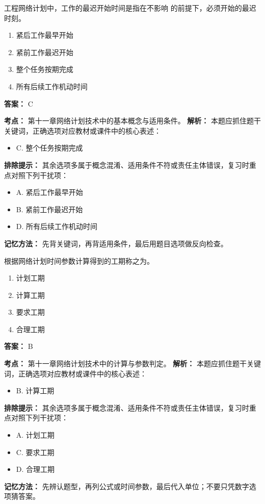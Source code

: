 \documentclass[UTF8,fontset=fandol,11pt]{ctexart}
\begin{document}
\begin{quizbox}[title={第 2 题}]
工程网络计划中，工作的最迟开始时间是指在不影响 的前提下，必须开始的最迟时刻。\\
\begin{enumerate}[label=\Alph*.]
\item 紧后工作最早开始
\item 紧前工作最迟开始
\item 整个任务按期完成
\item 所有后续工作机动时间
\end{enumerate}
\textbf{答案：} C
\vspace{0.25em}
\begin{answerbox}[title={考点解析}]
\textbf{考点：} 第十一章网络计划技术中的基本概念与适用条件。
\textbf{解析：} 本题应抓住题干关键词，正确选项对应教材或课件中的核心表述：
\begin{itemize}
\item C. 整个任务按期完成
\end{itemize}
\textbf{排除提示：} 其余选项多属于概念混淆、适用条件不符或责任主体错误，复习时重点对照下列干扰项：
\begin{itemize}
\item A. 紧后工作最早开始
\item B. 紧前工作最迟开始
\item D. 所有后续工作机动时间
\end{itemize}
\textbf{记忆方法：} 先背关键词，再背适用条件，最后用题目选项做反向检查。
\end{answerbox}
\end{quizbox}

\begin{quizbox}[title={第 3 题}]
根据网络计划时间参数计算得到的工期称之为。\\
\begin{enumerate}[label=\Alph*.]
\item 计划工期
\item 计算工期
\item 要求工期
\item 合理工期
\end{enumerate}
\textbf{答案：} B
\vspace{0.25em}
\begin{answerbox}[title={考点解析}]
\textbf{考点：} 第十一章网络计划技术中的计算与参数判定。
\textbf{解析：} 本题应抓住题干关键词，正确选项对应教材或课件中的核心表述：
\begin{itemize}
\item B. 计算工期
\end{itemize}
\textbf{排除提示：} 其余选项多属于概念混淆、适用条件不符或责任主体错误，复习时重点对照下列干扰项：
\begin{itemize}
\item A. 计划工期
\item C. 要求工期
\item D. 合理工期
\end{itemize}
\textbf{记忆方法：} 先辨认题型，再列公式或时间参数，最后代入单位；不要只凭数字选项猜答案。
\end{answerbox}
\end{quizbox}
\end{document}

